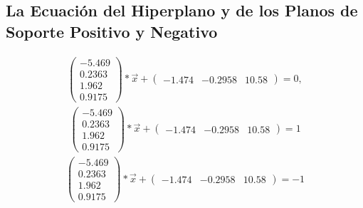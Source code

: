 \documentclass[fleqn]{llncs}
\begin{document}
\subsection{La Ecuación del Hiperplano y de los Planos de Soporte Positivo y Negativo}
\begin{align*}
	\begin{pmatrix}
		-5.469 \\
		0.2363 \\
		1.962 \\
		0.9175
		\end{pmatrix} * \overrightarrow{x} + \begin{pmatrix}
		-1.474 & -0.2958 & 10.58
		\end{pmatrix} = 0,
\end{align*}
\begin{align*}
	\begin{pmatrix}
		-5.469 \\
		0.2363 \\
		1.962 \\
		0.9175
	\end{pmatrix} * \overrightarrow{x} + \begin{pmatrix}
		-1.474 & -0.2958 & 10.58
	\end{pmatrix} = 1
\end{align*}
\begin{align*}
	\begin{pmatrix}
		-5.469 \\
		0.2363 \\
		1.962 \\
		0.9175
	\end{pmatrix} * \overrightarrow{x} + \begin{pmatrix}
		-1.474 & -0.2958 & 10.58
	\end{pmatrix} = -1
\end{align*}
\end{document}
